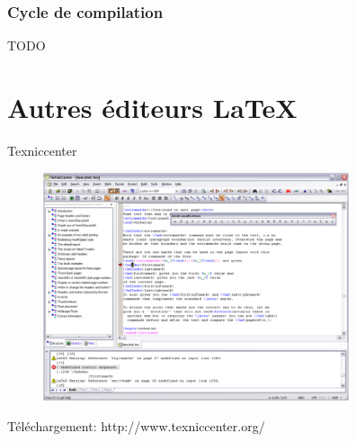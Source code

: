 \documentclass{beamer}
\begin{document}
\begin{frame}
\frametitle{Cycle de compilation}
TODO
\end{frame}


\section{Autres éditeurs \LaTeX}



\begin{frame}{Texniccenter}

\begin{figure} %
\centering %
\includegraphics[width=9cm]{img/Texniccenter} %
\end{figure} %

{\footnotesize Téléchargement: http://www.texniccenter.org/ }

\end{frame}


\end{document}

